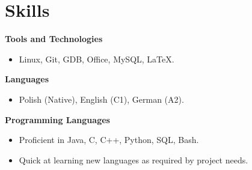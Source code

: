 \renewcommand{\subsection}[1]{
    \noindent\textbf{#1}
}

\section{Skills}

\vspace{-2em}

\begin{multicols}{2}

\subsection{Tools and Technologies}{}{}
\begin{itemize}
    \item Linux, Git, GDB, Office, MySQL, LaTeX.
\end{itemize}

\subsection{Languages}{}{}
\begin{itemize}
    \item Polish (Native), English (C1), German (A2).
\end{itemize}

\subsection{Programming Languages}{}{}
\begin{itemize}
    \item Proficient in Java, C, C++, Python, SQL, Bash.
    \item Quick at learning new languages as required by project needs.
\end{itemize}

\end{multicols}
